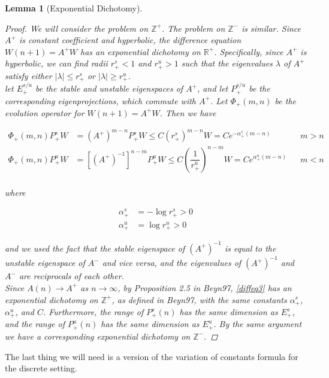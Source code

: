 \documentclass[12pt]{article}
\def\R{{\mathbb R}}
\def\Z{{\mathbb Z}}
\newtheorem{lemma}{Lemma}
\begin{document}
\begin{lemma}[Exponential Dichotomy]
\begin{proof}
We will consider the problem on $\Z^+$. The problem on $\Z^-$ is similar. Since $A^+$ is constant coefficient and hyperbolic, the difference equation $W(n+1) = A^+ W$ has an exponential dichotomy on $\R^+$. Specifically, since $A^+$ is hyperbolic, we can find radii $r_+^s < 1$ and $r_+^u > 1$ such that the eigenvalues $\lambda$ of $A^+$ satisfy either $|\lambda| \leq r_+^s$ or $|\lambda| \geq r_+^u$.\\

let $E_+^{s/u}$ be the stable and unstable eigenspaces of $A^+$, and let $P_+^{s/u}$ be the corresponding eigenprojections, which commute with $A^+$. Let $\Phi_+(m, n)$ be the evolution operator for $W(n+1) = A^+ W$. Then we have

\begin{align*}
\Phi_+(m, n) P_+^s W &= (A^+)^{m-n} P_+^s W \leq C (r_+^s)^{m-n} W = C e^{-\alpha_+^s (m - n)} && m > n \\
\Phi_+(m, n) P_+^u W &= [(A^+)^{-1}]^{n-m} P_+^u W \leq C \left( \dfrac{1}{r_+^u} \right)^{n-m} W = C e^{\alpha_+^u (m - n)} && m < n \\
\end{align*}

where 

\begin{align*}
\alpha_+^s &= -\log r_+^s > 0 \\
\alpha_+^u &= \log r_+^u > 0
\end{align*}

and we used the fact that the stable eigenspace of $(A^+)^{-1}$ is equal to the unstable eigenspace of $A^-$ and vice versa, and the eigenvalues of $(A^+)^{-1}$ and $A^-$ are reciprocals of each other.\\

Since $A(n) \rightarrow A^+$ as $n \rightarrow \infty$, by Proposition 2.5 in Beyn97, \eqref{diffeq3} has an exponential dichotomy on $\Z^+$, as defined in Beyn97, with the same constants $\alpha_+^s$, $\alpha_+^u$, and $C$. Furthermore, the range of $P_+^s(n)$ has the same dimension as $E_+^s$, and the range of $P_+^u(n)$ has the same dimension as $E_+^u$. By the same argument we have a corresponding exponential dichotomy on $\Z^-$.

\end{proof}
\end{lemma}

The last thing we will need is a version of the variation of constants formula for the discrete setting.
\end{document}
